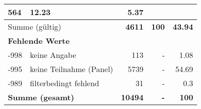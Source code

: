\begin{longtable}{lXrrr}
       \num{564} &
       \num[round-mode=places,round-precision=2]{12.23} &
         \num[round-mode=places,round-precision=2]{5.37} \\
     \midrule
     \multicolumn{2}{l}{Summe (gültig)} &
       \textbf{\num{4611}} &
     \textbf{\num{100}} &
       \textbf{\num[round-mode=places,round-precision=2]{43.94}} \\
     \multicolumn{5}{l}{\textbf{Fehlende Werte}}\\
       -998 &
       keine Angabe &
         \num{113} &
        - &
         \num[round-mode=places,round-precision=2]{1.08} \\
       -995 &
       keine Teilnahme (Panel) &
         \num{5739} &
        - &
         \num[round-mode=places,round-precision=2]{54.69} \\
       -989 &
       filterbedingt fehlend &
         \num{31} &
        - &
         \num[round-mode=places,round-precision=2]{0.3} \\
     \midrule
     \multicolumn{2}{l}{\textbf{Summe (gesamt)}} &
          \textbf{\num{10494}} &
        \textbf{-} &
        \textbf{\num{100}} \\
     \bottomrule
     \end{longtable}
     
